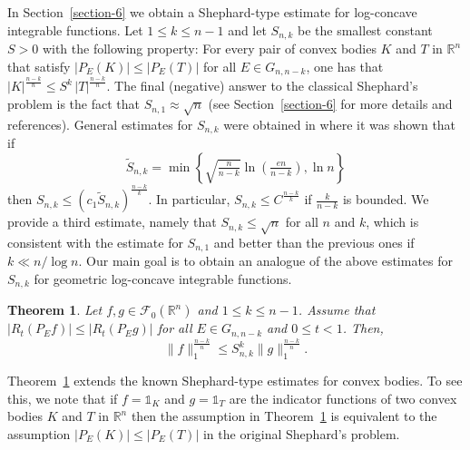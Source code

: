 \documentclass[11pt,leqno]{article}
\newtheorem{theorem}{Theorem}[section]
\theoremstyle{definition}
\theoremstyle{remark}
\numberwithin{equation}{section}
\newcommand{\ls}{\leqslant}
\newcommand{\1}{\textbf{1}}
\begin{document}
In Section~\ref{section-6} we obtain a Shephard-type estimate for log-concave integrable functions.
Let $1\ls k\ls n-1$ and let $S_{n,k}$ be the smallest constant $S >0$ with the following property: For
every pair of convex bodies $K$ and $T$ in ${\mathbb R}^n$ that satisfy
$|P_E(K)|\ls |P_E(T)|$ for all $E\in G_{n,n-k}$, one has that $|K|^{\frac{n-k}{n}}\ls S^k\,|T|^{\frac{n-k}{n}}$.
The final (negative) answer to the classical Shephard's problem is the fact that $S_{n,1}\approx\sqrt{n}$ (see
Section~\ref{section-6} for more details and references). General estimates for $S_{n,k}$ were
obtained in \cite{Giannopoulos-Koldobsky-2017} where it was shown that if
$$\tilde{S}_{n,k}=\min\left\{\sqrt{\tfrac{n}{n-k}}\ln\left (\tfrac{en}{n-k}\right),\ln n\right\}$$
then $S_{n,k}\ls (c_1\tilde{S}_{n,k})^{\frac{n-k}{k}}$. In particular, $S_{n,k}\ls C^{\frac{n-k}{k}}$
if $\frac{k}{n-k}$ is bounded. We provide a third estimate, namely that $S_{n,k}\ls\sqrt{n}$ for all $n$
and $k$, which is consistent with the estimate for $S_{n,1}$ and better than the previous ones if $k\ll n/\log n$.
Our main goal is to obtain an analogue of the above estimates for $S_{n,k}$ for geometric log-concave
integrable functions.

\begin{theorem}\label{th:intro-shephard}Let $f,g\in {\mathcal F}_0({\mathbb R}^n)$ and $1\ls k\ls n-1$. Assume that $|R_t(P_Ef)|\ls |R_t(P_Eg)|$ for all $E\in G_{n,n-k}$ and $0\ls t<1$. Then,
$$\|f\|_1^{\frac{n-k}{n}}\ls S_{n,k}^k\|g\|_1^{\frac{n-k}{n}}.$$
\end{theorem}

Theorem~\ref{th:intro-shephard} extends the known Shephard-type estimates for convex bodies. To see this, we note
that if $f=\mathds{1}_K$ and $g=\mathds{1}_T$ are the indicator functions of two convex bodies $K$ and $T$ in ${\mathbb R}^n$ then
the assumption in Theorem~\ref{th:intro-shephard} is equivalent to the assumption $|P_E(K)|\ls |P_E(T)|$
in the original Shephard's problem.

\smallskip
\end{document}
